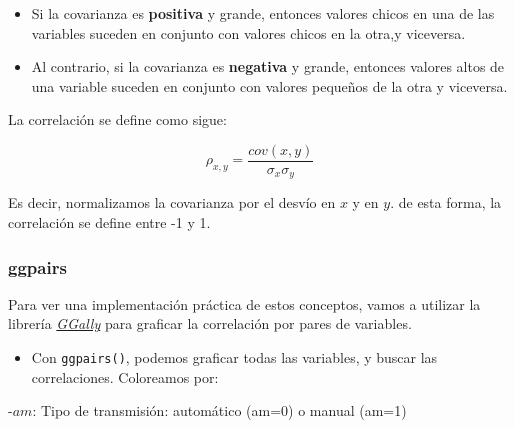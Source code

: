 \documentclass[]{book}
\newenvironment{Shaded}{\begin{snugshade}}{\end{snugshade}}
\newcommand{\DataTypeTok}[1]{\textcolor[rgb]{0.13,0.29,0.53}{#1}}
\newcommand{\KeywordTok}[1]{\textcolor[rgb]{0.13,0.29,0.53}{\textbf{#1}}}
\newcommand{\NormalTok}[1]{#1}
\newcommand{\OperatorTok}[1]{\textcolor[rgb]{0.81,0.36,0.00}{\textbf{#1}}}
\newcommand{\StringTok}[1]{\textcolor[rgb]{0.31,0.60,0.02}{#1}}
\providecommand{\tightlist}{%
  \setlength{\itemsep}{0pt}\setlength{\parskip}{0pt}}
\begin{document}
\begin{itemize}
\tightlist
\item
  Si la covarianza es \textbf{positiva} y grande, entonces valores chicos en una de las variables suceden en conjunto con valores chicos en la otra,y viceversa.
\item
  Al contrario, si la covarianza es \textbf{negativa} y grande, entonces valores altos de una variable suceden en conjunto con valores pequeños de la otra y viceversa.
\end{itemize}

La correlación se define como sigue:

\[\rho_{x,y}=\frac{cov(x,y)}{\sigma_x \sigma_y}\]

Es decir, normalizamos la covarianza por el desvío en \(x\) y en \(y\). de esta forma, la correlación se define entre -1 y 1.

\hypertarget{ggpairs}{%
\subsubsection{ggpairs}\label{ggpairs}}

Para ver una implementación práctica de estos conceptos, vamos a utilizar la librería \href{https://ggobi.github.io/ggally/}{\emph{GGally}} para graficar la correlación por pares de variables.

\begin{itemize}
\tightlist
\item
  Con \texttt{ggpairs()}, podemos graficar todas las variables, y buscar las correlaciones. Coloreamos por:
\end{itemize}

-\(am\): Tipo de transmisión: automático (am=0) o manual (am=1)

\begin{Shaded}
\end{Shaded}
\end{document}
